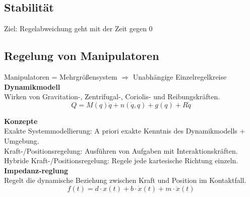 \subsection{Stabilität}
Ziel: Regelabweichung geht mit der Zeit gegen 0


\subsection{Regelung von Manipulatoren}
Manipulatoren = Mehrgrößensystem
\(\Rightarrow\) Unabhängige Einzelregelkreise\\

\textbf{Dynamikmodell}\\
Wirken von Gravitation-, Zentrifugal-, Coriolis- und Reibungskräften.
\[ Q = M(q)\ddot{q} + n(\dot{q}, q) + g(q) + R\dot{q}\]

\textbf{Konzepte}\\
Exakte Systemmodellierung: A priori exakte Kenntnis des Dynamikmodells + Umgebung.\\
Kraft-/Positionsregelung: Ausführen von Aufgaben mit Interaktionskräften.\\
Hybride Kraft-/Positionsregelung: Regele jede kartesische Richtung einzeln.\\

\textbf{Impedanz-reglung}\\
Regelt die dynamische Beziehung zwischen Kraft und Position im Kontaktfall.\\
\[f(t) = d \cdot x(t) + b \cdot \dot{x}(t) + m \cdot \ddot{x}(t)\]